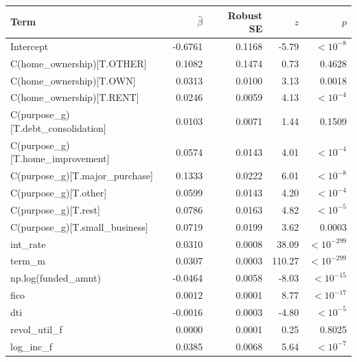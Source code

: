 \begin{tabular}{lrrrr}
\toprule
Term & $\hat\beta$ & Robust SE & $z$ & $p$ \\
\midrule
Intercept & -0.6761 & 0.1168 & -5.79 & $<10^{-8}$ \\
C(home\_ownership)[T.OTHER] & 0.1082 & 0.1474 & 0.73 & 0.4628 \\
C(home\_ownership)[T.OWN] & 0.0313 & 0.0100 & 3.13 & 0.0018 \\
C(home\_ownership)[T.RENT] & 0.0246 & 0.0059 & 4.13 & $<10^{-4}$ \\
C(purpose\_g)[T.debt\_consolidation] & 0.0103 & 0.0071 & 1.44 & 0.1509 \\
C(purpose\_g)[T.home\_improvement] & 0.0574 & 0.0143 & 4.01 & $<10^{-4}$ \\
C(purpose\_g)[T.major\_purchase] & 0.1333 & 0.0222 & 6.01 & $<10^{-8}$ \\
C(purpose\_g)[T.other] & 0.0599 & 0.0143 & 4.20 & $<10^{-4}$ \\
C(purpose\_g)[T.rest] & 0.0786 & 0.0163 & 4.82 & $<10^{-5}$ \\
C(purpose\_g)[T.small\_business] & 0.0719 & 0.0199 & 3.62 & 0.0003 \\
int\_rate & 0.0310 & 0.0008 & 38.09 & $<10^{-299}$ \\
term\_m & 0.0307 & 0.0003 & 110.27 & $<10^{-299}$ \\
np.log(funded\_amnt) & -0.0464 & 0.0058 & -8.03 & $<10^{-15}$ \\
fico & 0.0012 & 0.0001 & 8.77 & $<10^{-17}$ \\
dti & -0.0016 & 0.0003 & -4.80 & $<10^{-5}$ \\
revol\_util\_f & 0.0000 & 0.0001 & 0.25 & 0.8025 \\
log\_inc\_f & 0.0385 & 0.0068 & 5.64 & $<10^{-7}$ \\
\bottomrule
\end{tabular}
